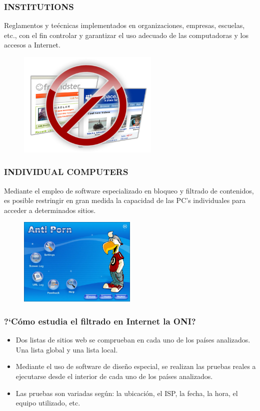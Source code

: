 \documentclass{beamer}
\begin{document}
\frame
{
\transdissolve[duration=0.2]
\frametitle{INSTITUTIONS}
Reglamentos y te\'ecnicas implementados en organizaciones, empresas, escuelas, etc., con el fin controlar y garantizar el uso adecuado de las computadoras y los accesos a Internet.
\begin{figure}
  \centering
    \includegraphics[width=0.6\textwidth]{bloq_rs.png}
  \label{fig:ejemplo}
\end{figure}
}

\frame
{
\transdissolve[duration=0.2]
\frametitle{INDIVIDUAL COMPUTERS}
Mediante el empleo de software especializado en bloqueo y filtrado de contenidos, es posible restringir en gran medida la capacidad de las PC's individuales para acceder a determinados sitios.
\begin{figure}
  \centering
    \includegraphics[width=0.5\textwidth]{bloq_ap.jpg}
  \label{fig:ejemplo}
\end{figure}
}

\frame
{
\transdissolve[duration=0.2]
\frametitle{?`C\'omo estudia el filtrado en Internet la ONI?}
\begin{itemize}
	\item Dos listas de sitios web se comprueban en cada uno de los pa\'ises analizados. Una lista global y una lista local.
	\item Mediante el uso de software de dise\~no especial, se realizan las pruebas reales a ejecutarse desde el interior de cada uno de los pa\'ises analizados.
	\item Las pruebas son variadas seg\'un: la ubicaci\'on, el ISP, la fecha, la hora, el equipo utilizado, etc. 
\end{itemize}
}
\end{document}
